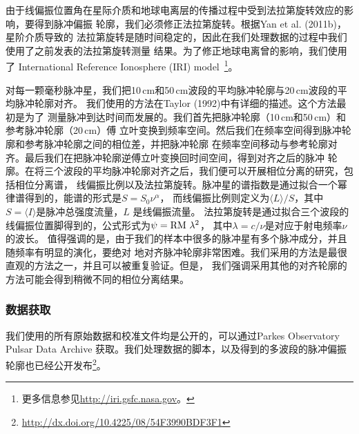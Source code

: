 由于线偏振位置角在星际介质和地球电离层的传播过程中受到法拉第旋转效应的影响，要得到脉冲偏振
轮廓，我们必须修正法拉第旋转。根据Yan et al. (2011b)\supercite{Yan11b}，星阶介质导致的
法拉第旋转是随时间稳定的，因此在我们处理数据的过程中我们使用了之前发表的法拉第旋转测量
结果\supercite{Keith11,Yan11b,Keith12,Burgay13}。为了修正地球电离曾的影响，我们使用了
International Reference Ionosphere (IRI) model~\footnote{更多信息参见\url{http://iri.gsfc.nasa.gov}。}。 

对每一颗毫秒脉冲星，我们把10\,cm和50\,cm波段的平均脉冲轮廓与20\,cm波段的平均脉冲轮廓对齐。
我们使用的方法在Taylor (1992)\supercite{Taylor92}中有详细的描述。这个方法最初是为了
测量脉冲到达时间而发展的。我们首先把脉冲轮廓（10\,cm和50\,cm）和参考脉冲轮廓（20\,cm）傅
立叶变换到频率空间。然后我们在频率空间得到脉冲轮廓和参考脉冲轮廓之间的相位差，并把脉冲轮廓
在频率空间移动与参考轮廓对齐。最后我们在把脉冲轮廓逆傅立叶变换回时间空间，得到对齐之后的脉冲
轮廓。在将三个波段的平均脉冲轮廓对齐之后，我们便可以开展相位分离的研究，包括相位分离谱，
线偏振比例以及法拉第旋转。脉冲星的谱指数是通过拟合一个幂律谱得到的，能谱的形式是$S=S_{0}\nu^{\alpha}$，
而线偏振比例则定义为$\langle L \rangle/S$，其中$S=\langle I\rangle$是脉冲总强度流量，$L$
是线偏振流量。
%
法拉第旋转是通过拟合三个波段的线偏振位置脚得到的，公式形式为$\psi=\rm{RM}\ \lambda^{2}$，
其中$\lambda=c/\nu$是对应于射电频率$\nu$的波长。
%
值得强调的是，由于我们的样本中很多的脉冲星有多个脉冲成分，并且随频率有明显的演化，要绝对
地对齐脉冲轮廓非常困难。我们采用的方法是最很直观的方法之一，并且可以被重复验证。但是，
我们强调采用其他的对齐轮廓的方法可能会得到稍微不同的相位分离结果。

\subsubsection{数据获取}

我们使用的所有原始数据和校准文件均是公开的，可以通过Parkes Observatory Pulsar Data Archive\supercite{Hobbs11}
获取。我们处理数据的脚本，以及得到的多波段的脉冲偏振轮廓也已经公开发布\footnote{\url{http://dx.doi.org/10.4225/08/54F3990BDF3F1}}。

